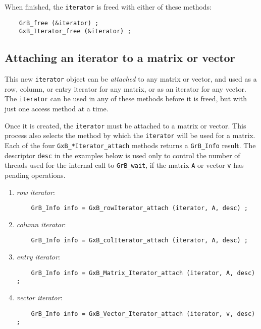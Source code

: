 \documentclass[12pt]{article}
\begin{document}
When finished, the \verb'iterator' is freed with either of these methods:

    {\footnotesize
    \begin{verbatim}
    GrB_free (&iterator) ;
    GxB_Iterator_free (&iterator) ; \end{verbatim}}

\subsection{Attaching an iterator to a matrix or vector}

This new \verb'iterator' object can be {\em attached} to any matrix or vector,
and used as a row, column, or entry iterator for any matrix, or as an iterator
for any vector.  The \verb'iterator' can be used in any of these methods before
it is freed, but with just one access method at a time.

Once it is created, the \verb'iterator' must be attached to a matrix or
vector.  This process also selects the method by which the \verb'iterator'
will be used for a matrix.  Each of the four \verb'GxB_*Iterator_attach'
methods returns a \verb'GrB_Info' result.  The descriptor \verb'desc' in the
examples below is used only to control the number of threads used for the
internal call to \verb'GrB_wait', if the matrix \verb'A' or vector \verb'v' has
pending operations.

    \begin{enumerate}
    \item {\em row iterator}: 
    {\footnotesize
    \begin{verbatim}
    GrB_Info info = GxB_rowIterator_attach (iterator, A, desc) ; \end{verbatim}}
    \item {\em column iterator}: 
    {\footnotesize
    \begin{verbatim}
    GrB_Info info = GxB_colIterator_attach (iterator, A, desc) ; \end{verbatim}}
    \item {\em entry iterator}:
    {\footnotesize
    \begin{verbatim}
    GrB_Info info = GxB_Matrix_Iterator_attach (iterator, A, desc) ; \end{verbatim}}
    \item {\em vector iterator}:
    {\footnotesize
    \begin{verbatim}
    GrB_Info info = GxB_Vector_Iterator_attach (iterator, v, desc) ; \end{verbatim}}
    \end{enumerate}
\end{document}
